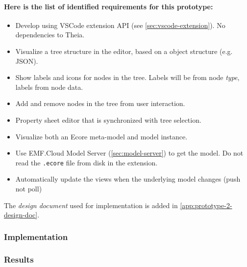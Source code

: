 \paragraph*{Here is the list of identified requirements for this prototype:}

\begin{itemize}
  \item Develop using VSCode extension \acrshort{API} (see \cref{sec:vscode-extension}). No dependencies to Theia.
  \item Visualize a tree structure in the editor, based on a object structure (e.g. \gls{JSON}).
  \item Show labels and icons for nodes in the tree. Labels will be from node \emph{type}, labels from node data.
  \item Add and remove nodes in the tree from user interaction.
  \item Property sheet editor that is synchronized with tree selection.
  \item Visualize both an Ecore meta-model and model instance.
  \item Use EMF.Cloud Model Server (\cref{sec:model-server}) to get the model. Do not read the \texttt{.ecore} file from disk in the extension.
  \item Automatically update the views when the underlying model changes (push not poll)
\end{itemize}

The \textit{design document} used for implementation is added in \cref{app:prototype-2-design-doc}.

\subsubsection{Implementation}

\subsubsection{Results}

